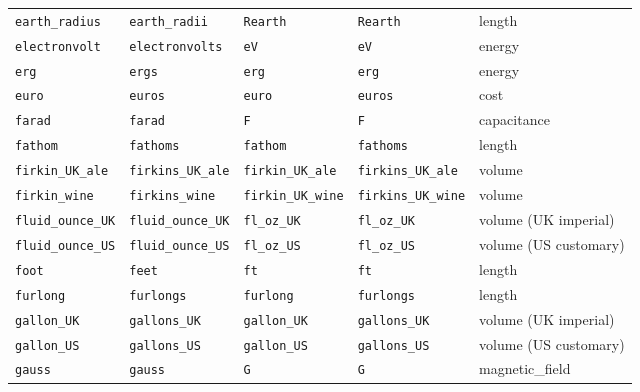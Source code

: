 \begin{landscape}
\begin{center}
\begin{longtable}{|lllll|}
{\tt\footnotesize earth\_radius} & {\tt\footnotesize earth\_radii} & {\tt\footnotesize Rearth} & {\tt\footnotesize Rearth} & length \\
{\tt\footnotesize electronvolt} & {\tt\footnotesize electronvolts} & {\tt\footnotesize eV} & {\tt\footnotesize eV} & energy \\
{\tt\footnotesize erg} & {\tt\footnotesize ergs} & {\tt\footnotesize erg} & {\tt\footnotesize erg} & energy \\
{\tt\footnotesize euro} & {\tt\footnotesize euros} & {\tt\footnotesize euro} & {\tt\footnotesize euros} & cost \\
{\tt\footnotesize farad} & {\tt\footnotesize farad} & {\tt\footnotesize F} & {\tt\footnotesize F} & capacitance \\
{\tt\footnotesize fathom} & {\tt\footnotesize fathoms} & {\tt\footnotesize fathom} & {\tt\footnotesize fathoms} & length \\
{\tt\footnotesize firkin\_UK\_ale} & {\tt\footnotesize firkins\_UK\_ale} & {\tt\footnotesize firkin\_UK\_ale} & {\tt\footnotesize firkins\_UK\_ale} & volume \\
{\tt\footnotesize firkin\_wine} & {\tt\footnotesize firkins\_wine} & {\tt\footnotesize firkin\_UK\_wine} & {\tt\footnotesize firkins\_UK\_wine} & volume \\
{\tt\footnotesize fluid\_ounce\_UK} & {\tt\footnotesize fluid\_ounce\_UK} & {\tt\footnotesize fl\_oz\_UK} & {\tt\footnotesize fl\_oz\_UK} & volume (UK imperial) \\
{\tt\footnotesize fluid\_ounce\_US} & {\tt\footnotesize fluid\_ounce\_US} & {\tt\footnotesize fl\_oz\_US} & {\tt\footnotesize fl\_oz\_US} & volume (US customary) \\
{\tt\footnotesize foot} & {\tt\footnotesize feet} & {\tt\footnotesize ft} & {\tt\footnotesize ft} & length \\
{\tt\footnotesize furlong} & {\tt\footnotesize furlongs} & {\tt\footnotesize furlong} & {\tt\footnotesize furlongs} & length \\
{\tt\footnotesize gallon\_UK} & {\tt\footnotesize gallons\_UK} & {\tt\footnotesize gallon\_UK} & {\tt\footnotesize gallons\_UK} & volume (UK imperial) \\
{\tt\footnotesize gallon\_US} & {\tt\footnotesize gallons\_US} & {\tt\footnotesize gallon\_US} & {\tt\footnotesize gallons\_US} & volume (US customary) \\
{\tt\footnotesize gauss} & {\tt\footnotesize gauss} & {\tt\footnotesize G} & {\tt\footnotesize G} & magnetic\_field \\

\end{longtable}
\end{center}
\end{landscape}
